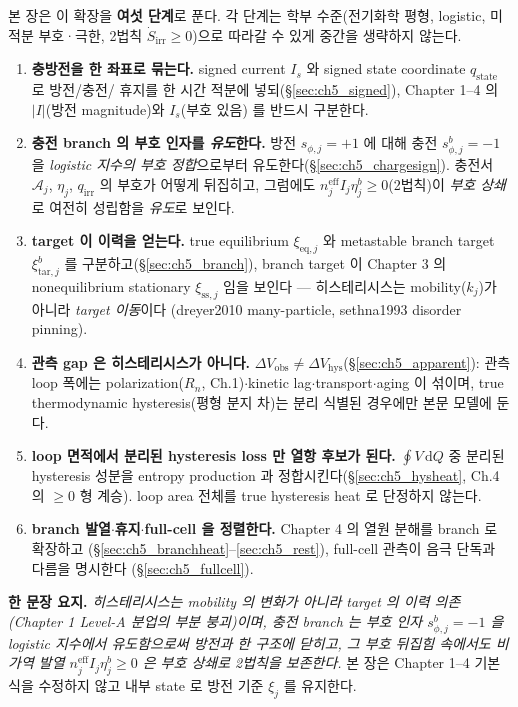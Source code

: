 \documentclass[11pt,a4paper]{article}
\newcommand{\dd}{\mathrm{d}}
\newcommand{\eff}{\mathrm{eff}}
\newcommand{\eq}{\mathrm{eq}}
\newcommand{\irr}{\mathrm{irr}}
\newcommand{\hys}{\mathrm{hys}}
\newcommand{\obs}{\mathrm{obs}}
\newcommand{\tar}{\mathrm{tar}}
\newcommand{\stt}{\mathrm{state}}
\newcommand{\sstat}{\mathrm{ss}}
\begin{document}
본 장은 이 확장을 \textbf{여섯 단계}로 푼다. 각 단계는 학부 수준(전기화학 평형, logistic, 미적분 부호·극한,
2법칙 $\dot S_\irr\ge0$)으로 따라갈 수 있게 중간을 생략하지 않는다.
\begin{enumerate}[label=\textbf{(\arabic*)},leftmargin=2.2em]
\item \textbf{충방전을 한 좌표로 묶는다.} signed current $I_s$ 와 signed state coordinate $q_\stt$ 로 방전/충전/
  휴지를 한 시간 적분에 넣되(\S\ref{sec:ch5_signed}), Chapter 1--4 의 $|I|$(방전 magnitude)와 $I_s$(부호 있음)
  를 반드시 구분한다.
\item \textbf{충전 branch 의 부호 인자를 \emph{유도}한다.} 방전 $s_{\phi,j}=+1$ 에 대해 충전
  $s_{\phi,j}^b=-1$ 을 \emph{logistic 지수의 부호 정합}으로부터 유도한다(\S\ref{sec:ch5_chargesign}). 충전서
  $\mathcal A_j$, $\eta_j$, $q_\irr$ 의 부호가 어떻게 뒤집히고, 그럼에도 $n_j^{\eff}I_j\eta_j^b\ge0$(2법칙)이
  \emph{부호 상쇄}로 여전히 성립함을 \emph{유도}로 보인다.
\item \textbf{target 이 이력을 얻는다.} true equilibrium $\xi_{\eq,j}$ 와 metastable branch target
  $\xi_{\tar,j}^b$ 를 구분하고(\S\ref{sec:ch5_branch}), branch target 이 Chapter 3 의 nonequilibrium
  stationary $\xi_{\sstat,j}$ 임을 보인다 — 히스테리시스는 mobility($k_j$)가 아니라 \emph{target 이동}이다
  (dreyer2010 many-particle, sethna1993 disorder pinning).
\item \textbf{관측 gap 은 히스테리시스가 아니다.} $\Delta V_\obs\ne\Delta V_\hys$(\S\ref{sec:ch5_apparent}):
  관측 loop 폭에는 polarization($R_n$, Ch.1)$\cdot$kinetic lag$\cdot$transport$\cdot$aging 이 섞이며, true
  thermodynamic hysteresis(평형 분지 차)는 분리 식별된 경우에만 본문 모델에 둔다.
\item \textbf{loop 면적에서 분리된 hysteresis loss 만 열항 후보가 된다.} $\oint V\,\dd Q$ 중 분리된 hysteresis
  성분을 entropy production 과 정합시킨다(\S\ref{sec:ch5_hysheat}, Ch.4 의 $\ge0$ 형 계승). loop area 전체를 true hysteresis heat 로
  단정하지 않는다.
\item \textbf{branch 발열$\cdot$휴지$\cdot$full-cell 을 정렬한다.} Chapter 4 의 열원 분해를 branch 로 확장하고
  (\S\ref{sec:ch5_branchheat}--\ref{sec:ch5_rest}), full-cell 관측이 음극 단독과 다름을 명시한다
  (\S\ref{sec:ch5_fullcell}).
\end{enumerate}

\noindent\textbf{한 문장 요지.} \emph{히스테리시스는 mobility 의 변화가 아니라 target 의 이력 의존(Chapter 1 Level-A
분업의 부분 붕괴)이며, 충전 branch 는 부호 인자 $s_{\phi,j}^b=-1$ 을 logistic 지수에서 \emph{유도}함으로써
방전과 한 구조에 닫히고, 그 부호 뒤집힘 속에서도 비가역 발열 $n_j^{\eff}I_j\eta_j^b\ge0$ 은 부호 상쇄로
2법칙을 보존한다.} 본 장은 Chapter 1--4 기본식을 수정하지 않고 내부 state 로 방전 기준 $\xi_j$ 를 유지한다.
\end{document}
